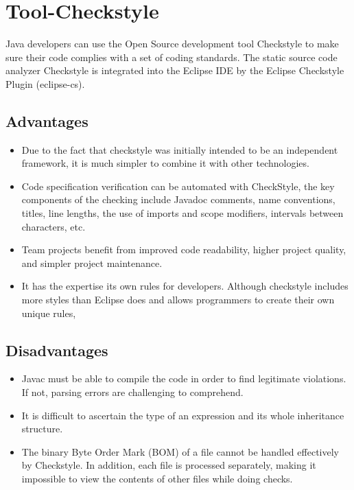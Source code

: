 \documentclass[12pt,a4paper]{report}
\begin{document}
\section{Tool-Checkstyle}
Java developers can use the Open Source development tool Checkstyle to make sure their code complies with a set of coding standards. The static source code analyzer Checkstyle is integrated into the Eclipse IDE by the Eclipse Checkstyle Plugin (eclipse-cs).

\subsection{Advantages}
\begin{itemize}
    \item{Due to the fact that checkstyle was initially intended to be an independent framework, it is much simpler to combine it with other technologies.}
    
    \item{Code specification verification can be automated with CheckStyle, the key components of the checking include Javadoc comments, name conventions, titles, line lengths, the use of imports and scope modifiers, intervals between characters, etc.}
    
    \item{Team projects benefit from improved code readability, higher project quality, and simpler project maintenance.}
    
    \item{It has the expertise its own rules for developers. Although checkstyle includes more styles than Eclipse does and allows programmers to create their own unique rules,}
\end{itemize}

\subsection{Disadvantages}
\begin{itemize}
    \item{Javac must be able to compile the code in order to find legitimate violations. If not, parsing errors are challenging to comprehend.}
    
    \item{It is difficult to ascertain the type of an expression and its whole inheritance structure.}
    
    \item{The binary Byte Order Mark (BOM) of a file cannot be handled effectively by Checkstyle. In addition, each file is processed separately, making it impossible to view the contents of other files while doing checks.}
\end{itemize}
\end{document}
